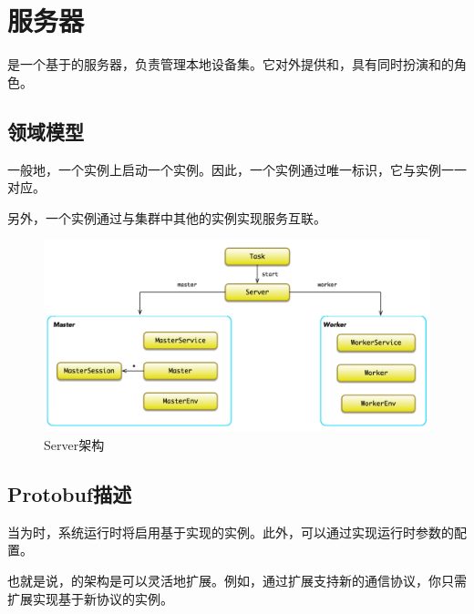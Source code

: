 \section{服务器}

\begin{content}

是一个基于的服务器，负责管理本地设备集。它对外提供和，具有同时扮演和的角色。

\subsection{领域模型}

一般地，一个实例上启动一个实例。因此，一个实例通过唯一标识，它与实例一一对应。

另外，一个实例通过与集群中其他的实例实现服务互联。

\begin{figure}[H]
\centering
\includegraphics[width=1.0\textwidth]{figures/cc-server-model.png}
\caption{Server架构}
 \label{fig:cc-server-model}
\end{figure}

\subsection{Protobuf描述}

当为时，系统运行时将启用基于实现的实例。此外，可以通过实现运行时参数的配置。

也就是说，\tf{}的架构是可以灵活地扩展。例如，通过扩展支持新的通信协议，你只需扩展实现基于新协议的实例。


\end{content}
